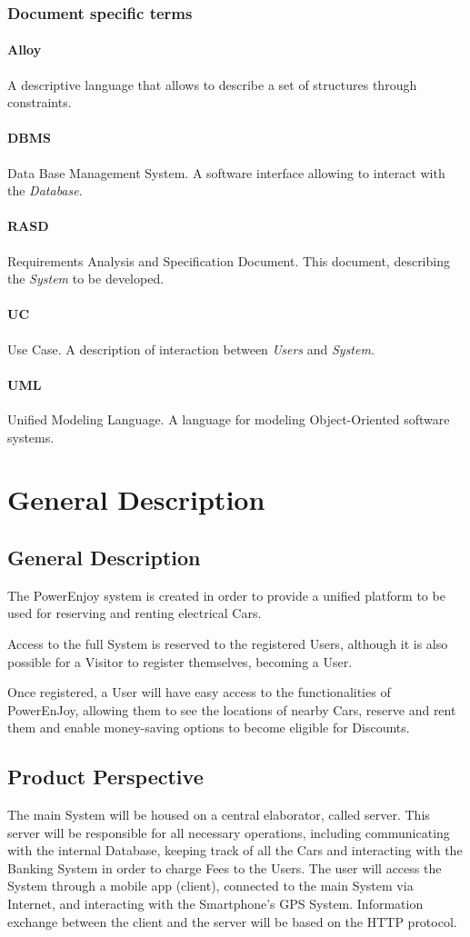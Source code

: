 \subsubsection{Document specific terms}
\paragraph{Alloy}
A descriptive language that allows to describe a set of structures through constraints.
\paragraph{DBMS}
Data Base Management System. A software interface allowing to interact with the \emph{Database}.
\paragraph{RASD}
Requirements Analysis and Specification Document. This document, describing the \emph{System} to be developed.
\paragraph{UC}
Use Case. A description of interaction between \emph{Users} and \emph{System}.
\paragraph{UML}
Unified Modeling Language. A language for modeling Object-Oriented software systems.

\clearpage\section{General Description}
\subsection{General Description}
The PowerEnjoy system is created in order to provide a unified platform to be used for reserving and renting electrical Cars.

Access to the full System is reserved to the registered Users, although it is also possible for a Visitor to register themselves, becoming a User.

Once registered, a User will have easy access to the functionalities of PowerEnJoy, allowing them to see the locations of nearby Cars, reserve and rent them and enable money-saving options to become eligible for Discounts.

\subsection{Product Perspective}
The main System will be housed on a central elaborator, called server. This server will be responsible for all necessary operations, including communicating with the internal Database, keeping track of all the Cars and interacting with the Banking System in order to charge Fees to the Users.
The user will access the System through a mobile app (client), connected to the main System via Internet, and interacting with the Smartphone's GPS System. Information exchange between the client and the server will be based on the HTTP protocol.

